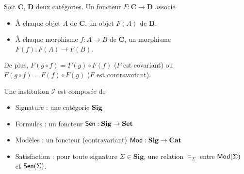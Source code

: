 \documentclass{beamer}
\newcommand{\gr}{\textbf}
\newcommand{\info}[1]{\text{{\fontfamily{lmss}\selectfont #1}}}
\newcommand{\Mod}{\info{Mod}}
\newcommand{\Sen}{\info{Sen}}
\newcommand{\itemz}{\item[$\triangleright$]}
\begin{document}
\begin{frame}[fragile]
\begin{definition}[Foncteur]
Soit $\gr{C}$, $\gr{D}$ deux catégories. Un foncteur $F : \gr{C} \to \gr{D}$ associe 
\begin{itemize}
\item \`A chaque objet $A$ de $\gr{C}$, un objet $F(A)$ de $\gr{D}$.
\item \`A chaque morphisme $f : A \to B$ de $\gr{C}$, un morphisme $F(f) : F(A) \to F(B)$. 
\end{itemize}
De plus, $F(g \circ f) = F(g) \circ F(f)$ ($F$ est covariant) ou $F(g \circ f) = F(f) \circ F(g)$ ($F$ est contravariant). 
\end{definition}
\pause
\begin{center}
\end{center}

\end{frame}

\begin{frame}

\begin{definition}[Institution]
Une institution $\mathcal{I}$ est composée de
\begin{itemize}
\itemz Signature : une catégorie $\textbf{Sig}$
\itemz Formules : un foncteur $\Sen : \textbf{Sig} \to \textbf{Set}$
\itemz Modèles : un foncteur (contravariant) $\Mod : \textbf{Sig} \to \textbf{Cat}$
\itemz Satisfaction : pour toute signature $\Sigma \in \textbf{Sig}$, une relation $\models_\Sigma$ entre $\Mod(\Sigma)$ et $\Sen(\Sigma)$.
\end{itemize}
\end{definition}

\end{frame}
\end{document}
